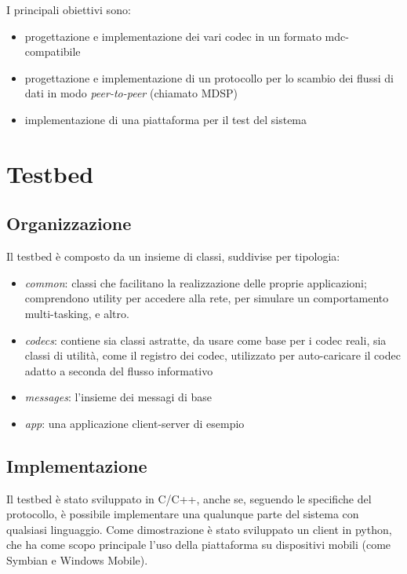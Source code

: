 I principali obiettivi sono:

\begin{itemize}
\item progettazione e implementazione dei vari codec in un formato mdc-compatibile
\item progettazione e implementazione di un protocollo per lo scambio dei
flussi di dati in modo \emph{peer-to-peer} (chiamato MDSP)
\item implementazione di una piattaforma per il test del sistema
\end{itemize}






\section{Testbed}



\subsection{Organizzazione}


Il testbed è composto da un insieme di classi, suddivise per tipologia:



\begin{itemize}
\item \emph{common}: classi che facilitano la realizzazione delle proprie
applicazioni; comprendono utility per accedere alla rete, per simulare un comportamento multi-tasking, e altro.

\item \emph{codecs}: contiene sia classi astratte, da usare come base per i
codec reali, sia classi di utilità, come il registro dei codec, utilizzato per auto-caricare il codec adatto a seconda del flusso informativo

\item \emph{messages}: l'insieme dei messagi di base
\item \emph{app}: una applicazione client-server di esempio
\end{itemize}




\subsection{Implementazione}


Il testbed è stato sviluppato in C/C++, anche se, seguendo le specifiche del
protocollo, è possibile implementare una qualunque parte del sistema con
qualsiasi linguaggio. Come dimostrazione è stato sviluppato un client in
python, che ha come scopo principale l'uso della piattaforma su dispositivi
mobili (come Symbian e Windows Mobile).








